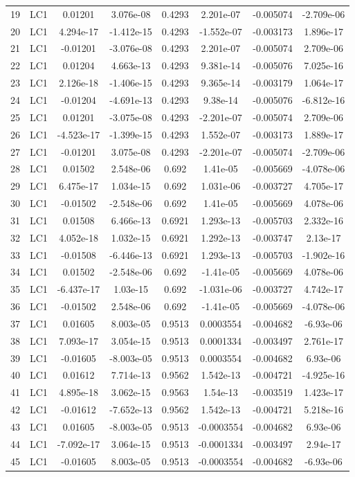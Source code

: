 \documentclass{article}%
\begin{document}
\begin{longtable}{| c c | c c c c c c |}
19&LC1&0.01201&3.076e{-}08&0.4293&2.201e{-}07&{-}0.005074&{-}2.709e{-}06\\%
20&LC1&4.294e{-}17&{-}1.412e{-}15&0.4293&{-}1.552e{-}07&{-}0.003173&1.896e{-}17\\%
21&LC1&{-}0.01201&{-}3.076e{-}08&0.4293&2.201e{-}07&{-}0.005074&2.709e{-}06\\%
22&LC1&0.01204&4.663e{-}13&0.4293&9.381e{-}14&{-}0.005076&7.025e{-}16\\%
23&LC1&2.126e{-}18&{-}1.406e{-}15&0.4293&9.365e{-}14&{-}0.003179&1.064e{-}17\\%
24&LC1&{-}0.01204&{-}4.691e{-}13&0.4293&9.38e{-}14&{-}0.005076&{-}6.812e{-}16\\%
25&LC1&0.01201&{-}3.075e{-}08&0.4293&{-}2.201e{-}07&{-}0.005074&2.709e{-}06\\%
26&LC1&{-}4.523e{-}17&{-}1.399e{-}15&0.4293&1.552e{-}07&{-}0.003173&1.889e{-}17\\%
27&LC1&{-}0.01201&3.075e{-}08&0.4293&{-}2.201e{-}07&{-}0.005074&{-}2.709e{-}06\\%
28&LC1&0.01502&2.548e{-}06&0.692&1.41e{-}05&{-}0.005669&{-}4.078e{-}06\\%
29&LC1&6.475e{-}17&1.034e{-}15&0.692&1.031e{-}06&{-}0.003727&4.705e{-}17\\%
30&LC1&{-}0.01502&{-}2.548e{-}06&0.692&1.41e{-}05&{-}0.005669&4.078e{-}06\\%
31&LC1&0.01508&6.466e{-}13&0.6921&1.293e{-}13&{-}0.005703&2.332e{-}16\\%
32&LC1&4.052e{-}18&1.032e{-}15&0.6921&1.292e{-}13&{-}0.003747&2.13e{-}17\\%
33&LC1&{-}0.01508&{-}6.446e{-}13&0.6921&1.293e{-}13&{-}0.005703&{-}1.902e{-}16\\%
34&LC1&0.01502&{-}2.548e{-}06&0.692&{-}1.41e{-}05&{-}0.005669&4.078e{-}06\\%
35&LC1&{-}6.437e{-}17&1.03e{-}15&0.692&{-}1.031e{-}06&{-}0.003727&4.742e{-}17\\%
36&LC1&{-}0.01502&2.548e{-}06&0.692&{-}1.41e{-}05&{-}0.005669&{-}4.078e{-}06\\%
37&LC1&0.01605&8.003e{-}05&0.9513&0.0003554&{-}0.004682&{-}6.93e{-}06\\%
38&LC1&7.093e{-}17&3.054e{-}15&0.9513&0.0001334&{-}0.003497&2.761e{-}17\\%
39&LC1&{-}0.01605&{-}8.003e{-}05&0.9513&0.0003554&{-}0.004682&6.93e{-}06\\%
40&LC1&0.01612&7.714e{-}13&0.9562&1.542e{-}13&{-}0.004721&{-}4.925e{-}16\\%
41&LC1&4.895e{-}18&3.062e{-}15&0.9563&1.54e{-}13&{-}0.003519&1.423e{-}17\\%
42&LC1&{-}0.01612&{-}7.652e{-}13&0.9562&1.542e{-}13&{-}0.004721&5.218e{-}16\\%
43&LC1&0.01605&{-}8.003e{-}05&0.9513&{-}0.0003554&{-}0.004682&6.93e{-}06\\%
44&LC1&{-}7.092e{-}17&3.064e{-}15&0.9513&{-}0.0001334&{-}0.003497&2.94e{-}17\\%
45&LC1&{-}0.01605&8.003e{-}05&0.9513&{-}0.0003554&{-}0.004682&{-}6.93e{-}06\\%
\end{longtable}%
\end{document}
